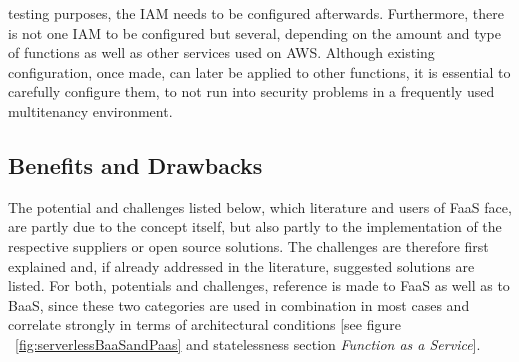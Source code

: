 \documentclass[a4paper,twoside,11pt, pagesize]{scrartcl}
\begin{document}
\begin{spacing}{1.2}
testing purposes, the IAM needs to be configured afterwards. Furthermore, there is not one IAM to be configured but several, depending on the amount and type of functions as well as other services used on AWS. Although existing configuration, once made, can later be applied to other functions, it is essential to carefully configure them, to not run into security problems in a frequently used multitenancy environment.
\subsection{Benefits and Drawbacks}
The potential and challenges listed below, which literature and users of FaaS face, are partly due to the concept itself, but also partly to the implementation of the respective suppliers or open source solutions. The challenges are therefore first explained and, if already addressed in the literature, suggested solutions are listed. For both, potentials and challenges, reference is made to FaaS as well as to BaaS, since these two categories are used in combination in most cases and correlate strongly in terms of architectural conditions [see figure ~\ref{fig:serverlessBaaSandPaas} and \glqq statelessness\grqqq{} section \textit{Function as a Service}].

\end{spacing}
\end{document}

